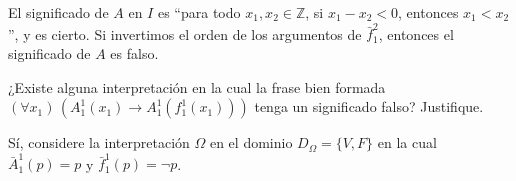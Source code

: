 \begin{solution}
El significado de $A$ en $I$ es ``para todo $x_1, x_2 \in \mathbb Z$, si $x_1 - x_2 < 0$, entonces $x_1 < x_2$'', y es cierto. Si invertimos el orden de los argumentos de $\bar f_1^2$, entonces el significado de $A$ es falso.
\end{solution}

\begin{exercise}
¿Existe alguna interpretación en la cual la frase bien formada $(\forall x_1) \, (A_1^1(x_1) \to A_1^1(f_1^1(x_1)))$ tenga un significado falso? Justifique.
\end{exercise}

\begin{solution}
Sí, considere la interpretación $\Omega$ en el dominio $D_\Omega = \{ V, F \}$ en la cual $\bar A_1^1(p) = p$ y $\bar f_1^1(p) = \neg p$.
\end{solution}
